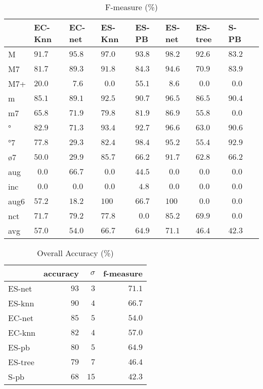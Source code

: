 \documentclass{article}
\begin{document}
\begin{table}
  \centering
\begin{tabular}{l|p{0.5cm}p{0.5cm}p{0.5cm}p{0.5cm}p{0.5cm}p{0.5cm}p{0.5cm}p{0.5cm}}
       &      EC-Knn &      EC-net &      ES-Knn &       ES-PB &      ES-net &     ES-tree &        S-PB \\ \hline
   M & $  91.7$ & $  95.8$ & $  97.0$ & $  93.8$ & $  98.2$ & $  92.6$ & $  83.2$ \\
  M7 & $  81.7$ & $  89.3$ & $  91.8$ & $  84.3$ & $  94.6$ & $  70.9$ & $  83.9$ \\
 M7+ & $  20.0$ & $ ~~7.6$ & $ ~~0.0$ & $  55.1$ & $ ~~8.6$ & $ ~~0.0$ & $ ~~0.0$ \\
   m & $  85.1$ & $  89.1$ & $  92.5$ & $  90.7$ & $  96.5$ & $  86.5$ & $  90.4$ \\
  m7 & $  65.8$ & $  71.9$ & $  79.8$ & $  81.9$ & $  86.9$ & $  55.8$ & $ ~~0.0$ \\
  ° & $  82.9$ & $  71.3$ & $  93.4$ & $  92.7$ & $  96.6$ & $  63.0$ & $  90.6$ \\
 °7 & $  77.8$ & $  29.3$ & $  82.4$ & $  98.4$ & $  95.2$ & $  55.4$ & $  92.9$ \\
 ø7 & $  50.0$ & $  29.9$ & $  85.7$ & $  66.2$ & $  91.7$ & $  62.8$ & $  66.2$ \\
 aug & $ ~~0.0$ & $  66.7$ & $ ~~0.0$ & $  44.5$ & $ ~~0.0$ & $ ~~0.0$ & $ ~~0.0$ \\
 inc & $ ~~0.0$ & $ ~~0.0$ & $ ~~0.0$ & $ ~~4.8$ & $ ~~0.0$ & $ ~~0.0$ & $ ~~0.0$ \\
aug6 & $  57.2$ & $  18.2$ & $ 100$ & $  66.7$ & $ 100$ & $ ~~0.0$ & $ ~~0.0$ \\
 nct & $  71.7$ & $  79.2$ & $  77.8$ & $ ~~0.0$ & $  85.2$ & $  69.9$ & $ ~~0.0$ \\
\hline avg & $  57.0$ & $  54.0$ & $  66.7$ & $  64.9$ & $  71.1$ & $  46.4$ & $  42.3$ \\
\end{tabular}


  \caption{F-measure (\%)}
  \label{tab:f-measure}
\end{table}



\begin{table}
  \centering
  \begin{tabular}{l|rrr}
       & accuracy& $\sigma$  & f-measure\\
\hline
ES-net &$   93  $&$  3$      &$71.1$ \\
ES-knn &$   90  $&$  4$      &$66.7$ \\
EC-net &$   85  $&$  5$      &$54.0$ \\
EC-knn &$   82  $&$  4$      &$57.0$ \\
ES-pb  &$   80  $&$  5$      &$64.9$ \\
ES-tree&$   79  $&$  7$      &$46.4$ \\
S-pb   &$   68  $&$ 15$      &$42.3$ \\

  \end{tabular}                                                        


  \caption{Overall Accuracy (\%)}
  \label{tab:accuracy}
\end{table}
\end{document}
